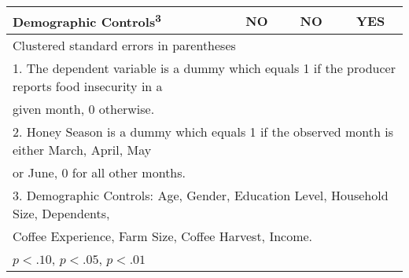 \begin{table}[htbp]
\begin{tabular}{l*{3}{c}}
Demographic Controls\textsuperscript{3}&          NO         &          NO         &         YES         \\
\bottomrule
\multicolumn{4}{l}{\footnotesize Clustered standard errors in parentheses}\\
\multicolumn{4}{l}{\footnotesize 1. The dependent variable is a dummy which equals 1 if the producer reports food insecurity in a}\\
\multicolumn{4}{l}{\footnotesize given month, 0 otherwise.}\\
\multicolumn{4}{l}{\footnotesize 2. Honey Season is a dummy which equals 1 if the observed month is either March, April, May}\\
\multicolumn{4}{l}{\footnotesize or June, 0 for all other months.}\\
\multicolumn{4}{l}{\footnotesize 3. Demographic Controls: Age, Gender, Education Level, Household Size, Dependents,}\\
\multicolumn{4}{l}{\footnotesize Coffee Experience, Farm Size, Coffee Harvest, Income.}\\
\multicolumn{4}{l}{\footnotesize \sym{*} \(p<.10\), \sym{**} \(p<.05\), \sym{***} \(p<.01\)}\\
\end{tabular}
\end{table}
